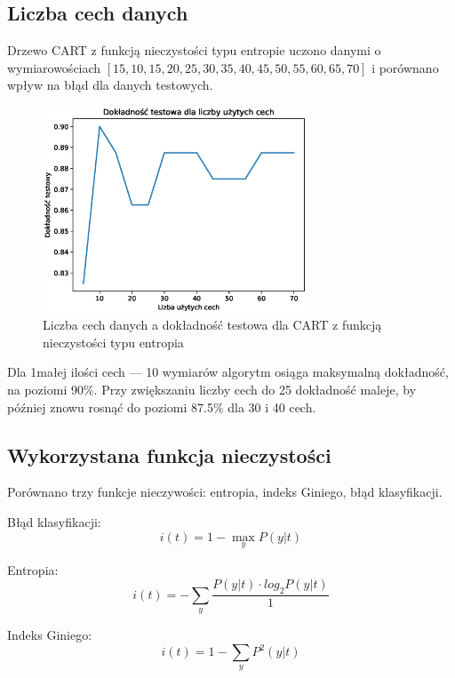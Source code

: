 \documentclass[11pt]{article}
\begin{document}
\subsection{Liczba cech danych}

Drzewo CART z funkcją nieczystości typu entropie uczono danymi o wymiarowościach $[15, 10, 15, 20, 25, 30, 35, 40, 45, 50, 55, 60, 65, 70]$ i porównano wpływ na błąd dla danych testowych.

\begin{figure}[H]
\center
\includegraphics[width=0.7\textwidth]{dimensions_test}
\caption{Liczba cech danych a dokładność testowa dla CART z funkcją nieczystości typu entropia }
\end{figure}

Dla 1małej ilości cech --- 10 wymiarów algorytm osiąga maksymalną dokładność, na poziomi 90\%. Przy zwiększaniu liczby cech do 25 dokładność maleje, by później znowu rosnąć do poziomi 87.5\% dla 30 i 40 cech.

\subsection{Wykorzystana funkcja nieczystości}

Porównano trzy funkcje nieczywości: entropia, indeks Giniego, błąd klasyfikacji.

Błąd klasyfikacji:
\begin{equation}
i(t) = 1 - \max_y P(y|t)
\end{equation}

Entropia:
\begin{equation}
i(t) = - \sum_y \frac{P(y|t) \cdot log_2 P(y|t)}{1}
\end{equation}

Indeks Giniego:
\begin{equation}
i(t) = 1 - \sum_y P^2(y|t)
\end{equation}
\end{document}
